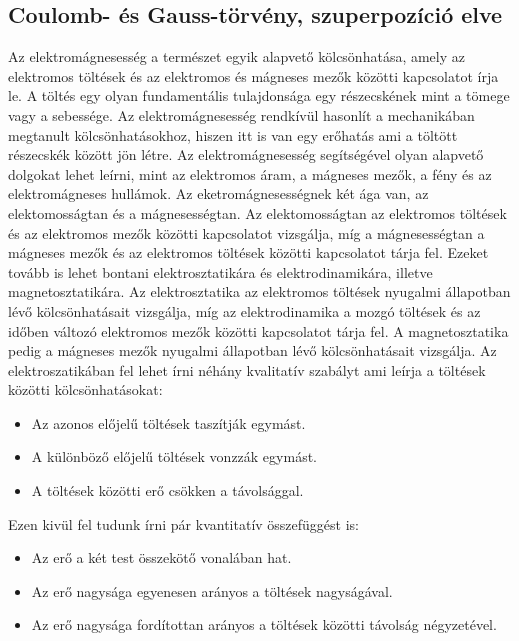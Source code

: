 \documentclass[../main.tex]{subfiles}
\begin{document}
\subsection{Coulomb- és Gauss-törvény, szuperpozíció elve}
Az elektromágnesesség a természet egyik alapvető kölcsönhatása, amely az elektromos töltések és az elektromos és mágneses mezők közötti kapcsolatot írja le.
A töltés egy olyan fundamentális tulajdonsága egy részecskének mint a tömege vagy a sebessége. Az elektromágnesesség rendkívül hasonlít a mechanikában megtanult
kölcsönhatásokhoz, hiszen itt is van egy erőhatás ami a töltött részecskék között jön létre. Az elektromágnesesség segítségével olyan alapvető dolgokat lehet leírni,
mint az elektromos áram, a mágneses mezők, a fény és az elektromágneses hullámok.
\newline
\newline
Az eketromágnesességnek két ága van, az elektomosságtan és a mágnesességtan. Az elektomosságtan az elektromos töltések és az elektromos mezők közötti kapcsolatot vizsgálja,
míg a mágnesességtan a mágneses mezők és az elektromos töltések közötti kapcsolatot tárja fel. Ezeket tovább is lehet bontani elektrosztatikára és elektrodinamikára,
illetve magnetosztatikára. Az elektrosztatika az elektromos töltések nyugalmi állapotban lévő kölcsönhatásait vizsgálja, míg az elektrodinamika a mozgó töltések és az időben változó elektromos mezők közötti kapcsolatot tárja fel.
A magnetosztatika pedig a mágneses mezők nyugalmi állapotban lévő kölcsönhatásait vizsgálja.
\newline
\newline
Az elektroszatikában fel lehet írni néhány kvalitatív szabályt ami leírja a töltések közötti kölcsönhatásokat:
\begin{itemize}
    \item Az azonos előjelű töltések taszítják egymást.
    \item A különböző előjelű töltések vonzzák egymást.
    \item A töltések közötti erő csökken a távolsággal.
\end{itemize}
Ezen kivül fel tudunk írni pár kvantitatív összefüggést is:
\begin{itemize}
    \item Az erő a két test összekötő vonalában hat.
    \item Az erő nagysága egyenesen arányos a töltések nagyságával.
    \item Az erő nagysága fordítottan arányos a töltések közötti távolság négyzetével.
\end{itemize}
\end{document}

